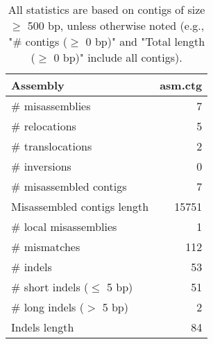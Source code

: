 \documentclass[12pt,a4paper]{article}
\begin{document}
\begin{table}[ht]
\begin{center}
\caption{All statistics are based on contigs of size $\geq$ 500 bp, unless otherwise noted (e.g., "\# contigs ($\geq$ 0 bp)" and "Total length ($\geq$ 0 bp)" include all contigs).}
\begin{tabular}{|l*{1}{|r}|}
\hline
Assembly & asm.ctg \\ \hline
\# misassemblies & 7 \\ \hline
\hspace{5mm}\# relocations & 5 \\ \hline
\hspace{5mm}\# translocations & 2 \\ \hline
\hspace{5mm}\# inversions & 0 \\ \hline
\# misassembled contigs & 7 \\ \hline
Misassembled contigs length & 15751 \\ \hline
\# local misassemblies & 1 \\ \hline
\# mismatches & 112 \\ \hline
\# indels & 53 \\ \hline
\hspace{5mm}\# short indels ($\leq$ 5 bp) & 51 \\ \hline
\hspace{5mm}\# long indels ($>$ 5 bp) & 2 \\ \hline
Indels length & 84 \\ \hline
\end{tabular}
\end{center}
\end{table}
\end{document}

